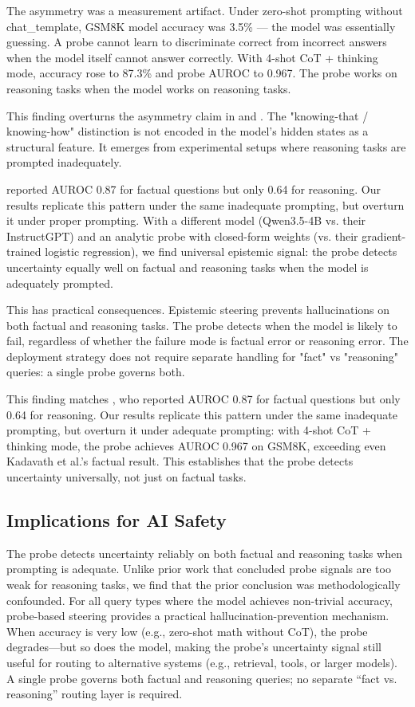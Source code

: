 \documentclass{article}
\begin{document}
The asymmetry was a measurement artifact. Under zero-shot prompting without chat_template, GSM8K model accuracy was 3.5\% — the model was essentially guessing. A probe cannot learn to discriminate correct from incorrect answers when the model itself cannot answer correctly. With 4-shot CoT + thinking mode, accuracy rose to 87.3\% and probe AUROC to 0.967. The probe works on reasoning tasks when the model works on reasoning tasks.

This finding overturns the asymmetry claim in \citet{kadavath2022language} and \citet{noanswer2025}. The "knowing-that / knowing-how" distinction is not encoded in the model's hidden states as a structural feature. It emerges from experimental setups where reasoning tasks are prompted inadequately.

\citet{kadavath2022language} reported AUROC 0.87 for factual questions but only 0.64 for reasoning. Our results replicate this pattern under the same inadequate prompting, but overturn it under proper prompting. With a different model (Qwen3.5-4B vs. their InstructGPT) and an analytic probe with closed-form weights (vs. their gradient-trained logistic regression), we find universal epistemic signal: the probe detects uncertainty equally well on factual and reasoning tasks when the model is adequately prompted.

This has practical consequences. Epistemic steering prevents hallucinations on both factual and reasoning tasks. The probe detects when the model is likely to fail, regardless of whether the failure mode is factual error or reasoning error. The deployment strategy does not require separate handling for "fact" vs "reasoning" queries: a single probe governs both.

This finding matches \citet{kadavath2022language}, who reported AUROC 0.87 for factual questions but only 0.64 for reasoning. Our results replicate this pattern under the same inadequate prompting, but overturn it under adequate prompting: with 4-shot CoT + thinking mode, the probe achieves AUROC 0.967 on GSM8K, exceeding even Kadavath et al.'s factual result. This establishes that the probe detects uncertainty universally, not just on factual tasks.

\subsection{Implications for AI Safety}

The probe detects uncertainty reliably on both factual and reasoning tasks when prompting is adequate. Unlike prior work that concluded probe signals are too weak for reasoning tasks, we find that the prior conclusion was methodologically confounded. For all query types where the model achieves non-trivial accuracy, probe-based steering provides a practical hallucination-prevention mechanism. When accuracy is very low (e.g., zero-shot math without CoT), the probe degrades—but so does the model, making the probe's uncertainty signal still useful for routing to alternative systems (e.g., retrieval, tools, or larger models). A single probe governs both factual and reasoning queries; no separate ``fact vs. reasoning'' routing layer is required.
\end{document}
